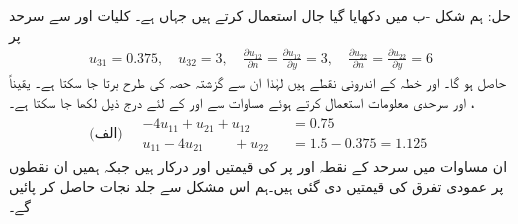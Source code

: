 حل:\quad
ہم شکل -ب میں دکھایا گیا جال استعمال کرتے ہیں جہاں  ہے۔ کلیات  اور  سے  سرحد پر
\begin{align}\label{مساوات_اعدادی_مخلوط_سرحدی_الف}
u_{31}=0.375,\quad u_{32}=3,\quad \frac{\partial u_{12}}{\partial n}=\frac{\partial u_{12}}{\partial y}=3,\quad \frac{\partial u_{22}}{\partial n}=\frac{\partial u_{22}}{\partial y}=6
\end{align}
حاصل ہو گا۔  اور  خطہ  کے اندرونی نقطے ہیں لہٰذا ان سے گزشتہ حصہ  کی طرح برتا جا سکتا ہے۔ یقیناً ،   اور سرحدی معلومات استعمال کرتے ہوئے مساوات   سے  اور  کے لئے درج ذیل لکھا جا سکتا ہے۔
\begin{gather}
\text{(الف)}\quad 
\begin{aligned}\label{مساوات_اعدادی_مخلوط_سرحدی_ب}
-4u_{11}+u_{21}+u_{12}\phantom{+u_{21}}&=0.75\\
u_{11}-4u_{21}\phantom{+u_{21}}+u_{22}&=1.5-0.375=1.125
\end{aligned}
\end{gather}
ان مساوات میں سرحد کے نقطہ  اور  پر  کی قیمتیں  اور  درکار ہیں جبکہ ہمیں ان نقطوں پر عمودی تفرق  کی قیمتیں دی گئی ہیں۔ہم اس مشکل سے جلد نجات حاصل کر پائیں گے۔

